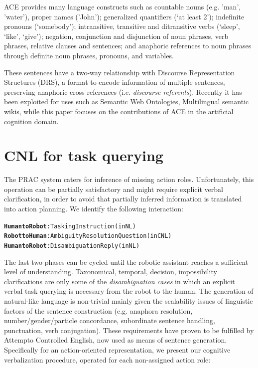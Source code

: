 \documentclass[oribibl]{llncs}
\begin{document}
ACE provides many language constructs such as countable nouns (e.g. 'man', 'water'), proper names ('John'); 
generalized quantifiers (‘at least 2’); indefinite pronouns (‘somebody’); intransitive, transitive and ditransitive verbs (‘sleep’, ‘like’, ‘give’); negation, conjunction and disjunction of noun phrases, verb phrases, relative clauses and sentences; and anaphoric references to noun phrases through definite noun phrases, pronouns, and variables.

These sentences have a two-way relationship with Discourse Representation Structures (DRS), a format to encode information of multiple sentences, preserving anaphoric cross-references (i.e. \textit{discourse referents})\cite{kamp1993discourse}.
Recently it has been exploited for uses such as Semantic Web Ontologies\cite{decoi2009rewerse}, Multilingual semantic wikis\cite{kuhnkaljurandsemantic}, while this paper focuses on the contributions of ACE in the artificial cognition domain.

\section{CNL for task querying}
The PRAC system caters for inference of missing action roles. Unfortunately, this operation can be partially satisfactory and might require explicit verbal clarification, in order to avoid that partially inferred information is translated into action planning.
We identify the following interaction:
{\large
\begin{alltt}
\textbf{\color{Red}Human to Robot} : Tasking Instruction            (in NL)
\textbf{\color{Blue}Robot to Human} : Ambiguity Resolution Question (in CNL)
\textbf{\color{Red}Human to Robot} : Disambiguation Reply           (in NL)
\end{alltt}
}
The last two phases can be cycled until the robotic assistant reaches a sufficient level of understanding. 
Taxonomical, temporal, decision, impossibility clarifications are only some of the \textit{disambiguation cases} in which an explicit verbal task querying is necessary from the robot to the human. 
The generation of natural-like language is non-trivial mainly given the scalability issues of linguistic factors of the sentence construction (e.g. anaphora resolution, number/gender/particle concordance, subordinate sentence handling, punctuation, verb conjugation). These requirements have proven to be fulfilled by Attempto Controlled English, now used as means of sentence generation.\\
Specifically for an action-oriented representation, we present our cognitive verbalization procedure, operated for each non-assigned action role:
\end{document}
